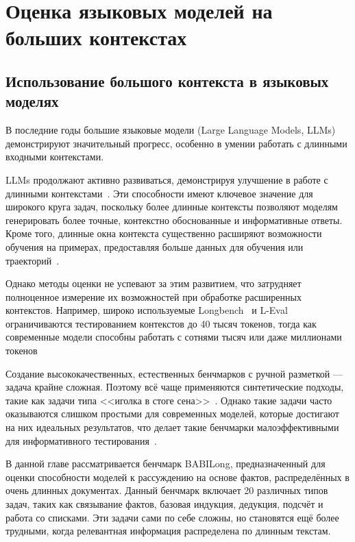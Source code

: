 \chapter{Оценка языковых моделей на больших контекстах}\label{ch:ch4}

\section{Использование большого контекста в языковых моделях}\label{sec:ch4/sect1}


В последние годы большие языковые модели (Large Language Models, LLMs) демонстрируют значительный прогресс, особенно в умении работать с длинными входными контекстами. 


LLMs продолжают активно развиваться, демонстрируя улучшение в работе с длинными контекстами~\cite{openai2023gpt4_turbo,reid2024gemini,anthropic2024claude3}. Эти способности имеют ключевое значение для широкого круга задач, поскольку более длинные контексты позволяют моделям генерировать более точные, контекстно обоснованные и информативные ответы. Кроме того, длинные окна контекста существенно расширяют возможности обучения на примерах, предоставляя больше данных для обучения или траекторий~\cite{chevalier-etal-2023-adapting,agarwal2024many,lee2024supervised}.

Однако методы оценки не успевают за этим развитием, что затрудняет полноценное измерение их возможностей при обработке расширенных контекстов. Например, широко используемые Longbench~\cite{bai2023longbench} и L-Eval~\cite{l_eval_an2023} ограничиваются тестированием контекстов до 40 тысяч токенов, тогда как современные модели способны работать с сотнями тысяч или даже миллионами токенов~\cite{rodkin2024associative,reid2024gemini,bulatov2023scaling,anthropic2024claude3,liu2024world,gu2023mamba,openai2023gpt4}

Создание высококачественных, естественных бенчмарков с ручной разметкой — задача крайне сложная. Поэтому всё чаще применяются синтетические подходы, такие как задачи типа <<иголка в стоге сена>>~\cite{zhang2024inftybench,liu2024world,song2024countingstars,hsieh2024ruler}. Однако такие задачи часто оказываются слишком простыми для современных моделей, которые достигают на них идеальных результатов, что делает такие бенчмарки малоэффективными для информативного тестирования~\cite{reid2024gemini,commandr2024,liu2024world,wang2024xl3m}.


В данной главе рассматривается бенчмарк BABILong, предназначенный для оценки способности моделей к рассуждению на основе фактов, распределённых в очень длинных документах. Данный бенчмарк включает 20 различных типов задач, таких как связывание фактов, базовая индукция, дедукция, подсчёт и работа со списками. Эти задачи сами по себе сложны, но становятся ещё более трудными, когда релевантная информация распределена по длинным текстам.

